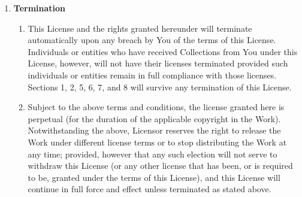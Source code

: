 \begin{enumerate}
  \item {\textbf{Termination}} 
  \begin{enumerate}
    \item {This License and the rights granted hereunder will terminate
    automatically upon any breach by You of the terms of this License.
    Individuals or entities who have received Collections from You under this
    License, however, will not have their licenses terminated provided such
    individuals or entities remain in full compliance with those licenses.
    Sections 1, 2, 5, 6, 7, and 8 will survive any termination of this License.}
    \item {Subject to the above terms and conditions, the license granted here
    is perpetual (for the duration of the applicable copyright in the Work).
    Notwithstanding the above, Licensor reserves the right to release the Work
    under different license terms or to stop distributing the Work at any time;
    provided, however that any such election will not serve to withdraw this
    License (or any other license that has been, or is required to be, granted
    under the terms of this License), and this License will continue in full
    force and effect unless terminated as stated above.}
  \end{enumerate}


\end{enumerate}
